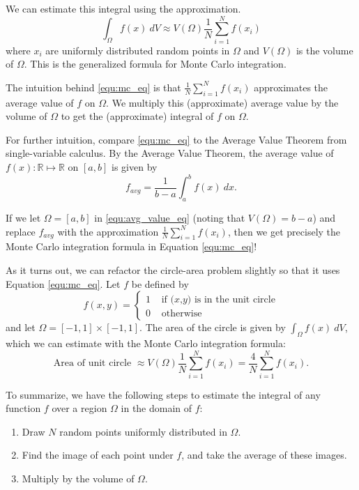 We can estimate this integral using the approximation.
\begin{equation}\label{equ:mc_eq}
\int_\Omega f(x)\:dV \approx V(\Omega) \frac{1}{N} \sum_{i=1}^N f(x_i)
\end{equation}
where $x_i$ are uniformly distributed random points in $\Omega$ and $V(\Omega)$ is the volume of $\Omega$.
This is the generalized formula for Monte Carlo integration. 

The intuition behind \eqref{equ:mc_eq} is that $\frac{1}{N} \sum_{i=1}^N f(x_i)$ approximates the average value of $f$ on $\Omega$.
We multiply this (approximate) average value by the volume of $\Omega$ to get the (approximate) integral of $f$ on $\Omega$.

For further intuition, compare \eqref{equ:mc_eq} to the Average Value Theorem from single-variable calculus. 
By the Average Value Theorem, the average value of $f(x) : \mathbb{R} \mapsto \mathbb{R} $ on ${[a,b]}$ is given by
\begin{equation}\label{equ:avg_value_eq}
f_{avg} = \frac{1}{b-a}\int_a^b f(x)\:dx.
\end{equation}

If we let $\Omega = {[a,b]}$ in \eqref{equ:avg_value_eq} (noting that $V(\Omega) = b - a$) and replace $f_{avg}$ with the approximation $\frac{1}{N} \sum_{i=1}^N f(x_i)$, then we get precisely the Monte Carlo integration formula in Equation \eqref{equ:mc_eq}!

As it turns out, we can refactor the circle-area problem slightly so that it uses Equation \eqref{equ:mc_eq}. 
Let $f$ be defined by 
$$f(x,y) = \begin{cases} 1 &\mbox{ if $(x$,$y)$ is in the unit circle} \\ 0 &\mbox{ otherwise} \end{cases}$$
and let $\Omega =   {[-1,1]} \times {[-1,1]}$.
The area of the circle is given by 
$\int_\Omega f(x)\:dV$,
which we can estimate with the Monte Carlo integration formula:
\[
\mbox{Area of unit circle } \approx V(\Omega) \frac{1}{N} \sum_{i=1}^N f(x_i) = \frac{4}{N} \sum_{i=1}^N f(x_i).
\]


To summarize, we have the following steps to estimate the integral of any function $f$ over a region $\Omega$ in the domain of $f$:
\begin{enumerate}
\item Draw $N$ random points uniformly distributed in $\Omega$.
\item Find the image of each point under $f$, and take the average of these images.
\item Multiply by the volume of $\Omega$.
\end{enumerate}


